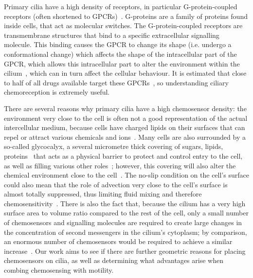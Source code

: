 Primary cilia have a high density of receptors, in particular G-protein-coupled receptors (often shortened to GPCRs)~. G-proteins are a family of proteins found inside cells, that act as molecular switches. The G-protein-coupled receptors are transmembrane structures that bind to a specific extracellular signalling molecule. This binding causes the GPCR to change its shape (i.e. undergo a conformational change) which affects the shape of the intracellular part of the GPCR, which allows this intracellular part to alter the environment within the cilium~, which can in turn affect the cellular behaviour. It is estimated that close to half of all drugs available target these GPCRs~, so understanding ciliary chemoreception is extremely useful.

There are several reasons why primary cilia have a high chemosensor density: the environment very close to the cell is often not a good representation of the actual intercellular medium, because cells have charged lipids on their surfaces that can repel or attract various chemicals and ions~. Many cells are also surrounded by a so-called glycocalyx, a several micrometre thick covering of sugars, lipids, proteins~ that acts as a physical barrier to protect and control entry to the cell, as well as filling various other roles~; however, this covering will also alter the chemical environment close to the cell~\cite{marshall_cilia_2006}. The no-slip condition on the cell's surface could also mean that the role of advection very close to the cell's surface is almost totally suppressed, thus limiting fluid mixing and therefore chemosensitivity~\cite{marshall_cilia_2006}. There is also the fact that, because the cilium has a very high surface area to volume ratio compared to the rest of the cell, only a small number of chemosensors and signalling molecules are required to create large changes in the concentration of second messengers in the cilium's cytoplasm; by comparison, an enormous number of chemosensors would be required to achieve a similar increase~\cite{marshall_cilia_2006}. Our work aims to see if there are further geometric reasons for placing chemosensors on cilia, as well as determining what advantages arise when combing chemosensing with motility.


